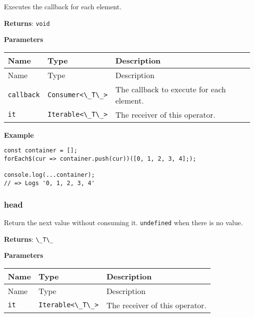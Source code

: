 Executes the callback for each element.

\textbf{Returns}: \passthrough{\lstinline!void!}

\textbf{Parameters}

\begin{longtable}[]{
  >{\raggedright\arraybackslash}p{}
  >{\raggedright\arraybackslash}p{}
  >{\raggedright\arraybackslash}p{}@{}}

\toprule\noalign{}
Name & Type & Description \\
\midrule\noalign{}
\endfirsthead
\toprule\noalign{}
Name & Type & Description \\
\midrule\noalign{}
\endhead
\bottomrule\noalign{}
\endlastfoot
\passthrough{\lstinline!callback!} &
\passthrough{\lstinline!Consumer<\_T\_>!} & The callback to execute for
each element. \\
\passthrough{\lstinline!it!} & \passthrough{\lstinline!Iterable<\_T\_>!}
& The receiver of this operator. \\
\end{longtable}

\textbf{Example}

\begin{lstlisting}[label=b489cddb-c6bb-4f87-9424-e1eca34f483b]
const container = [];
forEach$(cur => container.push(cur))([0, 1, 2, 3, 4];);
                                              
console.log(...container);
// => Logs '0, 1, 2, 3, 4'
\end{lstlisting}

\hypertarget{63acb1d6-3cf2-483f-9d14-aff83ac9fa7b}{%
\subsubsection{head}\label{63acb1d6-3cf2-483f-9d14-aff83ac9fa7b}}

Return the next value without consuming it.
\passthrough{\lstinline!undefined!} when there is no value.

\textbf{Returns}: \passthrough{\lstinline!\_T\_!}

\textbf{Parameters}

\begin{longtable}[]{
  >{\raggedright\arraybackslash}p{}
  >{\raggedright\arraybackslash}p{}
  >{\raggedright\arraybackslash}p{}@{}}

\toprule\noalign{}
Name & Type & Description \\
\midrule\noalign{}
\endfirsthead
\toprule\noalign{}
Name & Type & Description \\
\midrule\noalign{}
\endhead
\bottomrule\noalign{}
\endlastfoot
\passthrough{\lstinline!it!} & \passthrough{\lstinline!Iterable<\_T\_>!}
& The receiver of this operator. \\
\end{longtable}

